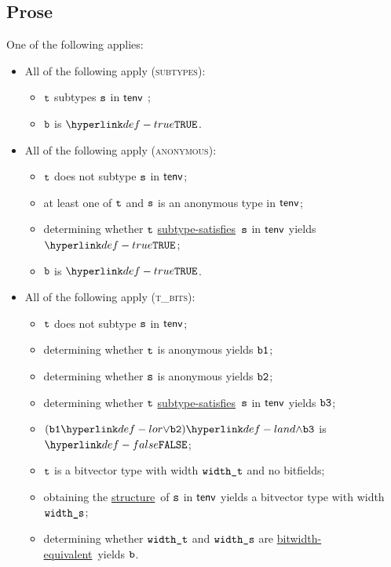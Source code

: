 \documentclass{book}
\newcommand\ProseOrTypeError[0]{\ProseTerminateAs{\TypeErrorConfig}}
\newcommand\structure[0]{\hyperlink{def-structure}{structure}}
\newcommand\subtypesatisfies[0]{\hyperlink{def-subtypesatisfies}{subtype-satisfies}}
\newcommand\bitwidthequivalent[0]{\hyperlink{def-bitwidthequal}{bitwidth-equivalent}}
\begin{document}
\subsection{Prose}
One of the following applies:
 \begin{itemize}
  \item All of the following apply (\textsc{subtypes}):
    \begin{itemize}
    \item $\texttt{t}$ subtypes $\texttt{s}$ in $\textsf{tenv}$ ;
    \item $\texttt{b}$ is $\True$.
  \end{itemize}

  \item All of the following apply (\textsc{anonymous}):
  \begin{itemize}
    \item $\texttt{t}$ does not subtype $\texttt{s}$ in $\textsf{tenv}$;
    \item at least one of $\texttt{t}$ and $\texttt{s}$ is an anonymous type in $\textsf{tenv}$;
    \item determining whether $\texttt{t}$ \subtypesatisfies\ $\texttt{s}$ in $\textsf{tenv}$ yields $\True$\ProseOrTypeError;
    \item $\texttt{b}$ is $\True$.
  \end{itemize}

  \item All of the following apply (\textsc{t\_bits}):
  \begin{itemize}
    \item $\texttt{t}$ does not subtype $\texttt{s}$ in $\textsf{tenv}$;
    \item determining whether $\texttt{t}$ is anonymous yields $\texttt{b1}$;
    \item determining whether $\texttt{s}$ is anonymous yields $\texttt{b2}$;
    \item determining whether $\texttt{t}$ \subtypesatisfies\ $\texttt{s}$ in $\textsf{tenv}$ yields $\texttt{b3}$;
    \item $(\vbone \lor \vbtwo) \land \vbthree$ is $\False$;
    \item $\texttt{t}$ is a bitvector type with width $\texttt{width\_t}$ and no bitfields;
    \item obtaining the \structure\ of $\texttt{s}$ in $\textsf{tenv}$ yields a bitvector type with width \\
          $\texttt{width\_s}$\ProseOrTypeError;
    \item determining whether $\texttt{width\_t}$ and $\texttt{width\_s}$ are \bitwidthequivalent\ yields $\texttt{b}$.
  \end{itemize}


\end{itemize}
\end{document}
